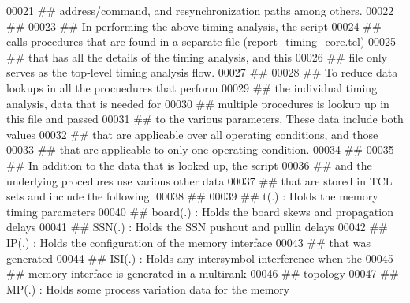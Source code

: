 \begin{DoxyCode}
00021 \textcolor{comment}{}\textcolor{comment}{## address/command, and resynchronization paths among others.}
00022 \textcolor{comment}{}\textcolor{comment}{##}
00023 \textcolor{comment}{}\textcolor{comment}{## In performing the above timing analysis, the script}
00024 \textcolor{comment}{}\textcolor{comment}{## calls procedures that are found in a separate file (report\_timing\_core.tcl)}
00025 \textcolor{comment}{}\textcolor{comment}{## that has all the details of the timing analysis, and this}
00026 \textcolor{comment}{}\textcolor{comment}{## file only serves as the top-level timing analysis flow.}
00027 \textcolor{comment}{}\textcolor{comment}{##}
00028 \textcolor{comment}{}\textcolor{comment}{## To reduce data lookups in all the procuedures that perform}
00029 \textcolor{comment}{}\textcolor{comment}{## the individual timing analysis, data that is needed for}
00030 \textcolor{comment}{}\textcolor{comment}{## multiple procedures is lookup up in this file and passed}
00031 \textcolor{comment}{}\textcolor{comment}{## to the various parameters.  These data include both values}
00032 \textcolor{comment}{}\textcolor{comment}{## that are applicable over all operating conditions, and those}
00033 \textcolor{comment}{}\textcolor{comment}{## that are applicable to only one operating condition.}
00034 \textcolor{comment}{}\textcolor{comment}{##}
00035 \textcolor{comment}{}\textcolor{comment}{## In addition to the data that is looked up, the script}
00036 \textcolor{comment}{}\textcolor{comment}{## and the underlying procedures use various other data}
00037 \textcolor{comment}{}\textcolor{comment}{## that are stored in TCL sets and include the following:}
00038 \textcolor{comment}{}\textcolor{comment}{##}
00039 \textcolor{comment}{}\textcolor{comment}{##   t(.)     : Holds the memory timing parameters}
00040 \textcolor{comment}{}\textcolor{comment}{##   board(.) : Holds the board skews and propagation delays}
00041 \textcolor{comment}{}\textcolor{comment}{##   SSN(.)   : Holds the SSN pushout and pullin delays}
00042 \textcolor{comment}{}\textcolor{comment}{##   IP(.)    : Holds the configuration of the memory interface}
00043 \textcolor{comment}{}\textcolor{comment}{##              that was generated}
00044 \textcolor{comment}{}\textcolor{comment}{##   ISI(.)   : Holds any intersymbol interference when the}
00045 \textcolor{comment}{}\textcolor{comment}{##              memory interface is generated in a multirank}
00046 \textcolor{comment}{}\textcolor{comment}{##              topology}
00047 \textcolor{comment}{}\textcolor{comment}{##   MP(.)    : Holds some process variation data for the memory}

\end{DoxyCode}
